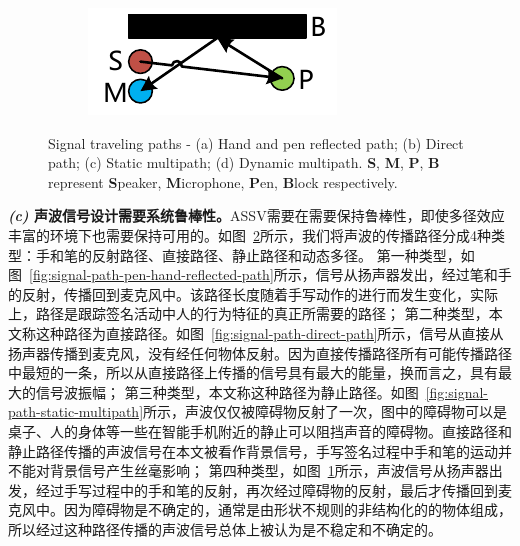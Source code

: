 \begin{figure}
\begin{subfigure}[b]{0.49\textwidth}
    \includegraphics[width=\textwidth]{figure/signal-path-dynamic-multipath}
    \caption{}
    \label{fig:signal-path-dynamic-multipath}
  \end{subfigure}
  {Signal traveling paths - (a) Hand and pen reflected path; (b) Direct path; (c) Static multipath; (d) Dynamic multipath. \textbf{S}, \textbf{M}, \textbf{P}, \textbf{B} represent \textbf{S}peaker, \textbf{M}icrophone, \textbf{P}en, \textbf{B}lock respectively.}
  \label{fig:signal-travel-paths}
\end{figure}

\textbf{\textit{(c)} 声波信号设计需要系统鲁棒性。}ASSV需要在需要保持鲁棒性，即使多径效应丰富的环境下也需要保持可用的。如图~\ref{fig:signal-travel-paths}所示，我们将声波的传播路径分成4种类型：手和笔的反射路径、直接路径、静止路径和动态多径。
第一种类型，如图~\ref{fig:signal-path-pen-hand-reflected-path}所示，信号从扬声器发出，经过笔和手的反射，传播回到麦克风中。该路径长度随着手写动作的进行而发生变化，实际上，路径是跟踪签名活动中人的行为特征的真正所需要的路径；
第二种类型，本文称这种路径为直接路径。如图~\ref{fig:signal-path-direct-path}所示，信号从直接从扬声器传播到麦克风，没有经任何物体反射。因为直接传播路径所有可能传播路径中最短的一条，所以从直接路径上传播的信号具有最大的能量，换而言之，具有最大的信号波振幅；
第三种类型，本文称这种路径为静止路径。如图~\ref{fig:signal-path-static-multipath}所示，声波仅仅被障碍物反射了一次，图中的障碍物可以是桌子、人的身体等一些在智能手机附近的静止可以阻挡声音的障碍物。直接路径和静止路径传播的声波信号在本文被看作背景信号，手写签名过程中手和笔的运动并不能对背景信号产生丝毫影响；
第四种类型，如图~\ref{fig:signal-path-dynamic-multipath}所示，声波信号从扬声器出发，经过手写过程中的手和笔的反射，再次经过障碍物的反射，最后才传播回到麦克风中。因为障碍物是不确定的，通常是由形状不规则的非结构化的的物体组成，所以经过这种路径传播的声波信号总体上被认为是不稳定和不确定的。

